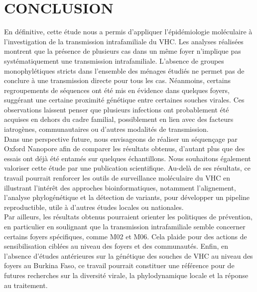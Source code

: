 \documentclass[a4paper,12pt]{article}
\begin{document}
\newpage 
\section*{CONCLUSION}

En définitive, cette étude nous a permis d’appliquer l’épidémiologie moléculaire à l’investigation de la transmission intrafamiliale du VHC. Les analyses réalisées montrent que la présence de plusieurs cas dans un même foyer n’implique pas systématiquement une transmission intrafamiliale. L’absence de groupes monophylétiques stricts dans l’ensemble des ménages étudiés ne permet pas de conclure à une transmission directe pour tous les cas. Néanmoins, certains regroupements de séquences ont été mis en évidence dans quelques foyers, suggérant une certaine proximité génétique entre certaines souches virales. Ces observations laissent penser que plusieurs infections ont probablement été acquises en dehors du cadre familial, possiblement en lien avec des facteurs iatrogènes, communautaires ou d’autres modalités de transmission.\\

Dans une perspective future, nous envisageons de réaliser un séquençage par Oxford Nanopore afin de comparer les résultats obtenus, d’autant plus que des essais ont déjà été entamés sur quelques échantillons. Nous souhaitons également valoriser cette étude par une publication scientifique. Au-delà de ses résultats, ce travail pourrait renforcer les outils de surveillance moléculaire du VHC en illustrant l’intérêt des approches bioinformatiques, notamment l’alignement, l’analyse phylogénétique et la détection de variants, pour développer un pipeline reproductible, utile à d’autres études locales ou nationales.\\

Par ailleurs, les résultats obtenus pourraient orienter les politiques de prévention, en particulier en soulignant que la transmission intrafamiliale semble concerner certains foyers spécifiques, comme M02 et M06. Cela plaide pour des actions de sensibilisation ciblées au niveau des foyers et des communautés. Enfin, en l’absence d’études antérieures sur la génétique des souches de VHC au niveau des foyers au Burkina Faso, ce travail pourrait constituer une référence pour de futures recherches sur la diversité virale, la phylodynamique locale et la réponse au traitement.


\newpage 

\setcounter{page}{4}

\printbibliography
\end{document}
